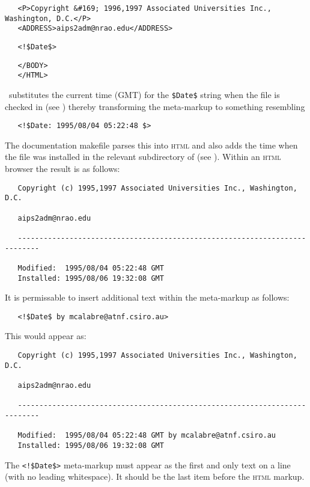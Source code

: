 \begin{verbatim}
   <P>Copyright &#169; 1996,1997 Associated Universities Inc., Washington, D.C.</P>
   <ADDRESS>aips2adm@nrao.edu</ADDRESS>
\end{verbatim}

\noindent
\verb+   <!$+\verb+Date$>+

\begin{verbatim}
   </BODY>
   </HTML>
\end{verbatim}

\noindent
\rcs\ substitutes the current time (GMT) for the \verb+$+\verb+Date$+ string
when the file is checked in (see ) thereby transforming the
meta-markup to something resembling

\noindent
\verb+   <!$+\verb+Date: 1995/08/04 05:22:48 $>+

\noindent
The documentation makefile parses this into \textsc{html} and also adds the
time when the  file was installed in the relevant subdirectory of
 (see ).  Within an \textsc{html} browser the
result is as follows:

\begin{verbatim}
   Copyright (c) 1995,1997 Associated Universities Inc., Washington, D.C.

   aips2adm@nrao.edu

   ---------------------------------------------------------------------------

   Modified:  1995/08/04 05:22:48 GMT
   Installed: 1995/08/06 19:32:08 GMT
\end{verbatim}

\noindent
It is permissable to insert additional text within the meta-markup as follows:

\noindent
\verb+   <!$+\verb+Date$ by mcalabre@atnf.csiro.au>+

\noindent
This would appear as:

\begin{verbatim}
   Copyright (c) 1995,1997 Associated Universities Inc., Washington, D.C.

   aips2adm@nrao.edu

   ---------------------------------------------------------------------------

   Modified:  1995/08/04 05:22:48 GMT by mcalabre@atnf.csiro.au
   Installed: 1995/08/06 19:32:08 GMT
\end{verbatim}

\noindent
The \verb+<!$+\verb+Date$>+ meta-markup must appear as the first and only text
on a line (with no leading whitespace).  It should be the last item before the
 \textsc{html} markup.
 
